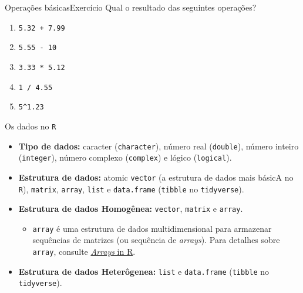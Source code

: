 \documentclass[
  10pt,
  ignorenonframetext,
]{beamer}
\providecommand{\tightlist}{%
  \setlength{\itemsep}{0pt}\setlength{\parskip}{0pt}}
\begin{document}
\begin{frame}[fragile]{Operações básicas\newline Exercício}
\protect\hypertarget{operauxe7uxf5es-buxe1sicasexercuxedcio}{}
Qual o resultado das seguintes operações?

\begin{enumerate}
\tightlist
\item
  \texttt{5.32\ +\ 7.99}
\item
  \texttt{5.55\ -\ 10}
\item
  \texttt{3.33\ *\ 5.12}
\item
  \texttt{1\ /\ 4.55}
\item
  \texttt{5\^{}1.23}
\end{enumerate}
\end{frame}

\begin{frame}[fragile]{Os dados no \texttt{R}}
\protect\hypertarget{os-dados-no-r}{}
\begin{itemize}
\tightlist
\item
  \textbf{Tipo de dados:} caracter (\texttt{character}), número real
  (\texttt{double}), número inteiro (\texttt{integer}), número complexo
  (\texttt{complex}) e lógico (\texttt{logical}).
\item
  \textbf{Estrutura de dados:} atomic \texttt{vector} (a estrutura de
  dados mais básicA no \texttt{R}), \texttt{matrix}, \texttt{array},
  \texttt{list} e \texttt{data.frame} (\texttt{tibble} no
  \texttt{tidyverse}).
\item
  \textbf{Estrutura de dados Homogênea:} \texttt{vector},
  \texttt{matrix} e \texttt{array}.

  \begin{itemize}
  \tightlist
  \item
    \texttt{array} é uma estrutura de dados multidimensional para
    armazenar sequências de matrizes (ou sequência de \emph{arrays}).
    Para detalhes sobre \texttt{array}, consulte
    \href{https://www.datacamp.com/tutorial/arrays-in-r}{\emph{Arrays}
    in R}.
  \end{itemize}
\item
  \textbf{Estrutura de dados Heterôgenea:} \texttt{list} e
  \texttt{data.frame} (\texttt{tibble} no \texttt{tidyverse}).
\end{itemize}
\end{frame}
\end{document}

